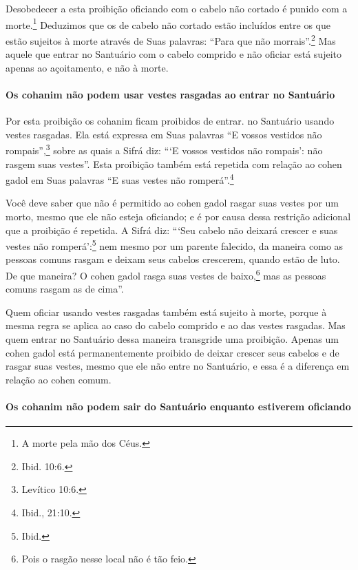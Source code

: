 \begin{multicols}{2}
Desobedecer a esta proibição oficiando com o cabelo não cortado é punido
com a morte.\footnote{A morte pela mão dos Céus.} Deduzimos que os de cabelo não
cortado estão incluídos entre os que estão sujeitos à morte através de
Suas palavras: ``Para que não morrais''.\footnote{Ibid. 10:6.} Mas aquele que
entrar no Santuário com o cabelo comprido e não oficiar está sujeito
apenas ao açoitamento, e não à morte.

\paragraph{Os cohanim\starr{} não podem usar vestes rasgadas ao entrar no Santuário}

Por esta proibição os cohanim\starr{} ficam proibidos de entrar. no
Santuário usando vestes rasgadas. Ela está expressa em Suas palavras ``E
vossos vestidos não rompais'',\footnote{Levítico 10:6.} sobre as quais a Sifrá\starr{}
diz: ```E vossos vestidos não rompais': não rasgem suas vestes''. Esta
proibição também está repetida com relação ao cohen gadol\starr{} em Suas
palavras ``E suas vestes não romperá''.\footnote{Ibid., 21:10.}

Você deve saber que não é permitido ao cohen gadol\starr{} rasgar suas
vestes por um morto, mesmo que ele não esteja oficiando; e é por causa
dessa restrição adicional que a proibição é repetida. A Sifrá\starr{} diz:
```Seu cabelo não deixará crescer e suas vestes não romperá':\footnote{Ibid.} nem mesmo por um
parente falecido, da maneira como as pessoas comuns rasgam e deixam seus
cabelos crescerem, quando estão de luto. De que maneira? O cohen
gadol\starr{} rasga suas vestes de baixo,\footnote{Pois o rasgão nesse local não é tão feio.} mas as pessoas comuns rasgam as de cima''.

Quem oficiar usando vestes rasgadas também está sujeito à morte, porque
à mesma regra se aplica ao caso do cabelo comprido e ao das vestes
rasgadas. Mas quem entrar no Santuário dessa maneira transgride uma
proibição. Apenas um cohen gadol\starr{} está permanentemente proibido de
deixar crescer seus cabelos e de rasgar suas vestes, mesmo que ele não
entre no Santuário, e essa é a diferença em relação ao cohen\starr{} comum.

\paragraph{Os cohanim\starr{} não podem sair do Santuário enquanto estiverem oficiando}


\end{multicols}
